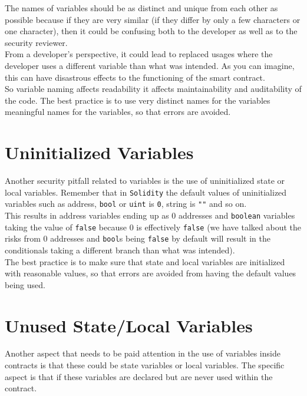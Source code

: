 The names of variables should be as distinct and unique from each other as possible because if they are very similar (if they differ by only a few characters or one character), then it could be confusing both to the developer as well as to the security reviewer. \\

From a developer's perspective, it could lead to replaced usages where the developer uses a different variable than what was intended. As you can imagine, this can have disastrous effects to the functioning of the smart contract. \\

So variable naming affects readability it affects maintainability and auditability of the code. The best practice is to use very distinct names for the variables meaningful names for the variables, so that errors are avoided.

\section{Uninitialized Variables}
Another security pitfall related to variables is the use of uninitialized state or local variables. Remember that in \texttt{Solidity} the default values of uninitialized variables such as address, \texttt{bool} or \texttt{uint} is \texttt{0}, string is \texttt{""} and so on.\\

This results in address variables ending up as 0 addresses and \texttt{boolean} variables taking the value of \texttt{false} because 0 is effectively \texttt{false} (we have talked about the risks from 0 addresses and \texttt{bool}s being \texttt{false} by default will result in the conditionals taking a different branch than what was intended). \\

The best practice is to make sure that state and local variables are initialized with reasonable values, so that errors are avoided from having the default values being used.

\section{Unused State/Local Variables}
Another aspect that needs to be paid attention in the use of variables inside contracts is that these could be state variables or local variables. The specific aspect is that if these variables are declared but are never used within the contract. \\

